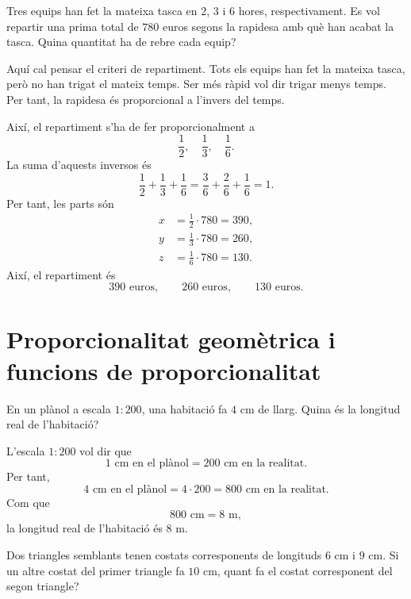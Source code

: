 \begin{exercici}
	Tres equips han fet la mateixa tasca en \(2\), \(3\) i \(6\) hores, respectivament. Es vol repartir una prima total de \(780\) euros segons la rapidesa amb què han acabat la tasca. Quina quantitat ha de rebre cada equip?
\end{exercici}

\begin{solucio}
	Aquí cal pensar el criteri de repartiment. Tots els equips han fet la mateixa tasca, però no han trigat el mateix temps. Ser més ràpid vol dir trigar menys temps. Per tant, la rapidesa és proporcional a l'invers del temps.

	Així, el repartiment s'ha de fer proporcionalment a
	\[
		\frac{1}{2},\quad \frac{1}{3},\quad \frac{1}{6}.
	\]
	La suma d'aquests inversos és
	\[
		\frac{1}{2}+\frac{1}{3}+\frac{1}{6}
		=
		\frac{3}{6}+\frac{2}{6}+\frac{1}{6}
		=
		1.
	\]
	Per tant, les parts són
	\[
	\begin{aligned}
		x&=\frac{1}{2}\cdot780=390,\\
		y&=\frac{1}{3}\cdot780=260,\\
		z&=\frac{1}{6}\cdot780=130.
	\end{aligned}
	\]
	Així, el repartiment és
	\[
		390\text{ euros},\qquad 260\text{ euros},\qquad 130\text{ euros}.
	\]
\end{solucio}

\section{Proporcionalitat geomètrica i funcions de proporcionalitat}

\begin{exercici}[Escales]
	En un plànol a escala \(1:200\), una habitació fa \(4\) cm de llarg. Quina és la longitud real de l'habitació?
\end{exercici}

\begin{solucio}
	L'escala \(1:200\) vol dir que
	\[
		1\text{ cm en el plànol}=200\text{ cm en la realitat}.
	\]
	Per tant,
	\[
		4\text{ cm en el plànol}=4\cdot200=800\text{ cm en la realitat}.
	\]
	Com que
	\[
		800\text{ cm}=8\text{ m},
	\]
	la longitud real de l'habitació és \(8\) m.
\end{solucio}

\begin{exercici}
	Dos triangles semblants tenen costats corresponents de longituds \(6\) cm i \(9\) cm. Si un altre costat del primer triangle fa \(10\) cm, quant fa el costat corresponent del segon triangle?
\end{exercici}

